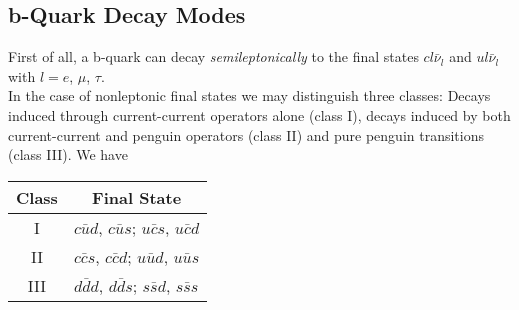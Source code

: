 \subsection{b-Quark Decay Modes}
\label{sec:InclB:bdecay}
First of all, a b-quark can decay {\it semileptonically\/} to the
final states $cl\bar\nu_l$ and $ul\bar\nu_l$ with $l=e$, $\mu$, $\tau$.
\\
In the case of nonleptonic final states we may distinguish three classes:
Decays induced through current-current operators alone (class I),
decays induced by both current-current and penguin operators (class II)
and pure penguin transitions (class III). We have

\begin{center}
\begin{tabular}{|c|l|}
\hline
Class & \multicolumn{1}{c|}{Final State} \\
\hline
I    & $c\bar ud$, \quad $c\bar us$; \qquad  $u\bar cs$, \quad $u\bar cd$ \\
II   & $c\bar cs$, \quad $c\bar cd$; \qquad  $u\bar ud$, \quad $u\bar us$ \\
III  & $d\bar dd$, \quad $d\bar ds$; \qquad  $s\bar sd$, \quad $s\bar ss$ \\
\hline
\end{tabular}
\end{center}


